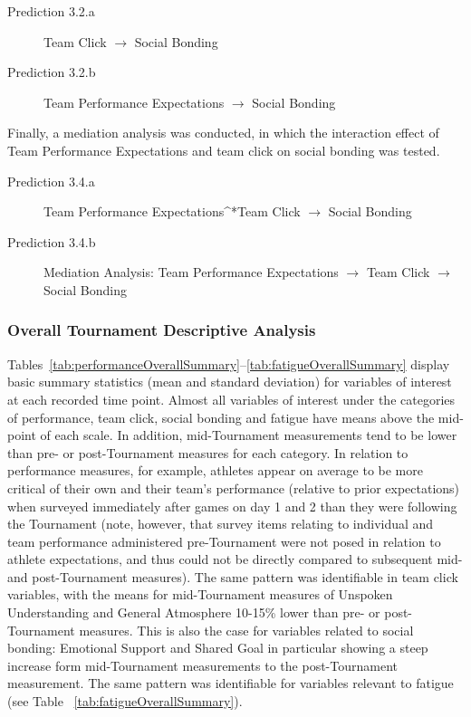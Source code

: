 \begin{description}
  \item [Prediction 3.2.a] Team Click $\rightarrow$ Social Bonding
  \item [Prediction 3.2.b] Team Performance Expectations $\rightarrow$ Social Bonding
\end{description}
\bigskip
Finally, a mediation analysis was conducted, in which the interaction effect of Team Performance Expectations and team click on social bonding was tested.
\bigskip
\begin{description}
\item[Prediction 3.4.a] Team Performance Expectations^*Team Click  $\rightarrow$ Social Bonding
\item[Prediction 3.4.b] Mediation Analysis: Team Performance Expectations $\rightarrow$ Team Click $\rightarrow$ Social Bonding
\end{description}
\clearpage




\subsubsection{Overall Tournament Descriptive Analysis}

Tables~\ref{tab:performanceOverallSummary}\nobreakdash--\ref{tab:fatigueOverallSummary} display basic summary statistics (mean and standard deviation) for variables of interest at each recorded time point. Almost all variables of interest under the categories of performance, team click, social bonding and fatigue have means above the mid-point of each scale. In addition, mid-Tournament measurements tend to be lower than pre- or post-Tournament measures for each category. In relation to performance measures, for example, athletes appear on average to be more critical of their own and their team’s performance (relative to prior expectations) when surveyed immediately after games on day 1 and 2 than they were following the Tournament (note, however, that survey items relating to individual and team performance administered pre-Tournament were not posed in relation to athlete expectations, and thus could not be directly compared to subsequent mid- and post-Tournament measures). The same pattern was identifiable in team click variables, with the means for mid-Tournament measures of Unspoken Understanding and General Atmosphere 10-15\% lower than pre- or post-Tournament measures. This is also the case for variables related to social bonding: Emotional Support and Shared Goal in particular showing a steep increase form mid-Tournament measurements to the post-Tournament measurement. The same pattern was identifiable for variables relevant to fatigue (see Table ~\ref{tab:fatigueOverallSummary}).

